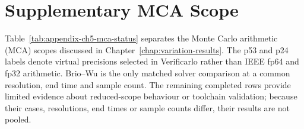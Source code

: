 \chapter{Supplementary MCA Scope}
\label{sec:appendix-ch5-mca-status}

Table~\ref{tab:appendix-ch5-mca-status} separates the Monte Carlo arithmetic
(MCA) scopes discussed in Chapter~\ref{chap:variation-results}. The p53 and p24 labels denote virtual
precisions selected in Verificarlo rather than IEEE fp64 and fp32 arithmetic.
Brio--Wu is the only matched solver comparison at a common resolution, end
time and sample count. The remaining completed rows provide limited evidence
about reduced-scope behaviour or toolchain validation; because their cases,
resolutions, end times or sample counts differ, their results are not pooled.



